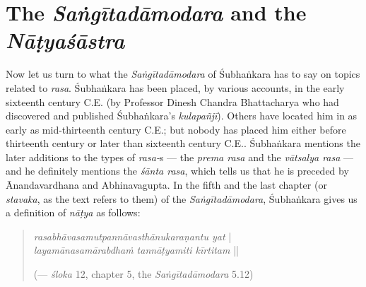 \section*{The \textsl{Saṅgītadāmodara} and the \textsl{Nāṭyaśāstra}}

Now let us turn to what the \textsl{Saṅgītadāmodara} of Śubhaṅkara has to say on topics related to \textsl{rasa}. Śubhaṅkara has been placed, by various accounts, in the early sixteenth century C.E. (by Professor Dinesh Chandra Bhattacharya who had discovered and published Śubhaṅkara’s \textsl{kulapañjī}). Others have located him in as early as mid-thirteenth century C.E.; but nobody has placed him either before thirteenth century or later than sixteenth century C.E.. Śubhaṅkara mentions the later additions to the types of \textsl{rasa-}s --- the \textsl{prema rasa} and the \textsl{vātsalya rasa} --- and he definitely mentions the \textsl{śānta rasa}, which tells us that he is preceded by Ānandavardhana and Abhinavagupta. In the fifth and the last chapter (or \textsl{stavaka}, as the text refers to them) of the \textsl{Saṅgītadāmodara}, Śubhaṅkara gives us a definition of \textsl{nāṭya} as follows:

\newpage

\begin{quote}
\textsl{rasabhāvasamutpannāvasthānukaraṇantu yat} |\\
\textsl{layamānasamārabdhaṁ tannāṭyamiti kīrtitam} || 

\hfill (--- \textsl{śloka} 12, chapter 5, the \textsl{Saṅgītadāmodara} 5.12) 
\end{quote}

